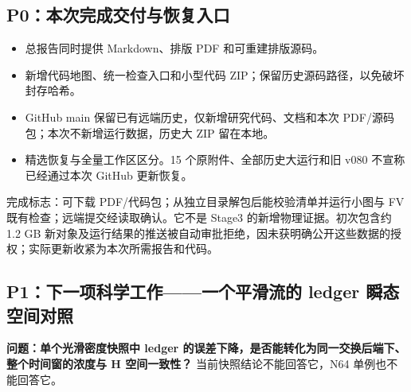 \documentclass[
  10pt,
  a4paper,
]{article}
\providecommand{\tightlist}{%
  \setlength{\itemsep}{0pt}\setlength{\parskip}{0pt}}
\begin{document}
\subsection{P0：本次完成交付与恢复入口}\label{p0ux672cux6b21ux5b8cux6210ux4ea4ux4ed8ux4e0eux6062ux590dux5165ux53e3}

\begin{itemize}
\tightlist
\item
  总报告同时提供 Markdown、排版 PDF 和可重建排版源码。
\item
  新增代码地图、统一检查入口和小型代码
  ZIP；保留历史源码路径，以免破坏封存哈希。
\item
  GitHub main 保留已有远端历史，仅新增研究代码、文档和本次
  PDF/源码包；本次不新增运行数据，历史大 ZIP 留在本地。
\item
  精选恢复与全量工作区区分。15 个原附件、全部历史大运行和旧 v080
  不宣称已经通过本次 GitHub 更新恢复。
\end{itemize}

完成标志：可下载 PDF/代码包；从独立目录解包后能校验清单并运行小图与 FV
既有检查；远端提交经读取确认。它不是 Stage3 的新增物理证据。初次包含约
1.2 GB
新对象及运行结果的推送被自动审批拒绝，因未获明确公开这些数据的授权；实际更新收紧为本次所需报告和代码。

\subsection{P1：下一项科学工作------一个平滑流的 ledger
瞬态空间对照}\label{p1ux4e0bux4e00ux9879ux79d1ux5b66ux5de5ux4f5cux4e00ux4e2aux5e73ux6ed1ux6d41ux7684-ledger-ux77acux6001ux7a7aux95f4ux5bf9ux7167}

\textbf{问题：单个光滑密度快照中 ledger
的误差下降，是否能转化为同一交换后端下、整个时间窗的浓度与 H
空间一致性？} 当前快照结论不能回答它，N64 单例也不能回答它。
\end{document}
